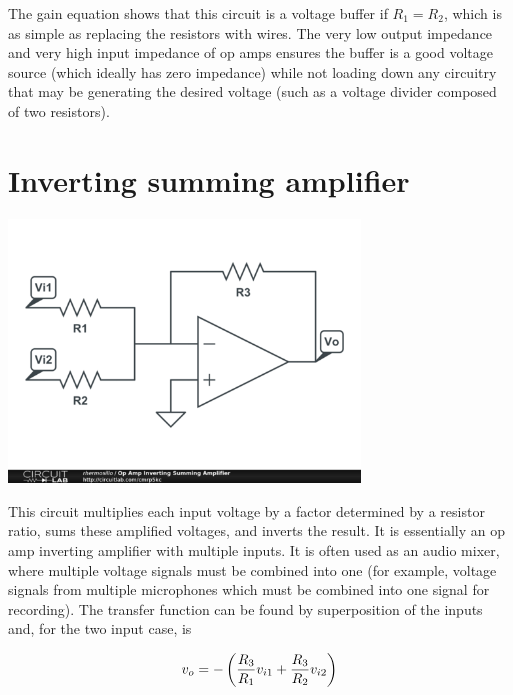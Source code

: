 The gain equation shows that this circuit is a voltage buffer if $R_1 = R_2$, which is as simple as replacing the resistors with wires.
The very low output impedance and very high input impedance of op amps ensures the buffer is a good voltage source (which ideally has zero impedance) while not loading down any circuitry that may be generating the desired voltage (such as a voltage divider composed of two resistors).

\section{Inverting summing amplifier}
\begin{center}
	\includegraphics[width=0.70\textwidth]{schematics/invsummingamp.PNG}
\end{center}

This circuit multiplies each input voltage by a factor determined by a resistor ratio, sums these amplified voltages, and inverts the result.
It is essentially an op amp inverting amplifier with multiple inputs.
It is often used as an audio mixer, where multiple voltage signals must be combined into one (for example, voltage signals from multiple microphones which must be combined into one signal for recording).
The transfer function can be found by superposition of the inputs and, for the two input case, is

\textcolor{red}{
\begin{equation}
v_o = -\left(\frac{R_3}{R_1}v_{i1} + \frac{R_3}{R_2}v_{i2}\right)
\label{eq:invertingsummingamplifier}
\end{equation}
}


